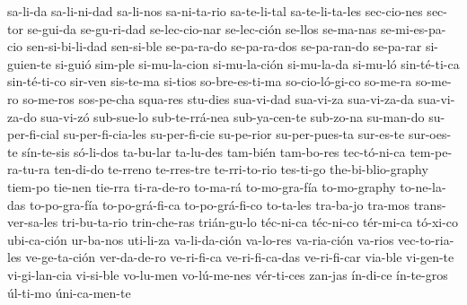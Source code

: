 {sa-li-da
sa-li-ni-dad
sa-li-nos
sa-ni-ta-rio
sa-te-li-tal
sa-te-li-ta-les
sec-cio-nes
sec-tor
se-gui-da
se-gu-ri-dad
se-lec-cio-nar
se-lec-ción
se-llos
se-ma-nas
se-mi-es-pa-cio
sen-si-bi-li-dad
sen-si-ble
se-pa-ra-do
se-pa-ra-dos
se-pa-ran-do
se-pa-rar
si-guien-te
si-guió
sim-ple
si-mu-la-cion
si-mu-la-ción
si-mu-la-da
si-mu-ló
sin-té-ti-ca
sin-té-ti-co
sir-ven
sis-te-ma
si-tios
so-bre-es-ti-ma
so-cio-ló-gi-co
so-me-ra
so-me-ro
so-me-ros
sos-pe-cha
squa-res
stu-dies
sua-vi-dad
sua-vi-za
sua-vi-za-da
sua-vi-za-do
sua-vi-zó
sub-sue-lo
sub-te-rrá-nea
sub-ya-cen-te
sub-zo-na
su-man-do
su-per-fi-cial
su-per-fi-cia-les
su-per-fi-cie
su-pe-rior
su-per-pues-ta
sur-es-te
sur-oes-te
sín-te-sis
só-li-dos
ta-bu-lar
ta-lu-des
tam-bién
tam-bo-res
tec-tó-ni-ca
tem-pe-ra-tu-ra
ten-di-do
te-rreno
te-rres-tre
te-rri-to-rio
tes-ti-go
the-bi-blio-graphy
tiem-po
tie-nen
tie-rra
ti-ra-de-ro
to-ma-rá
to-mo-gra-fía
to-mo-graphy
to-ne-la-das
to-po-gra-fía
to-po-grá-fi-ca
to-po-grá-fi-co
to-ta-les
tra-ba-jo
tra-mos
trans-ver-sa-les
tri-bu-ta-rio
trin-che-ras
trián-gu-lo
téc-ni-ca
téc-ni-co
tér-mi-ca
tó-xi-co
ubi-ca-ción
ur-ba-nos
uti-li-za
va-li-da-ción
va-lo-res
va-ria-ción
va-rios
vec-to-ria-les
ve-ge-ta-ción
ver-da-de-ro
ve-ri-fi-ca
ve-ri-fi-ca-das
ve-ri-fi-car
via-ble
vi-gen-te
vi-gi-lan-cia
vi-si-ble
vo-lu-men
vo-lú-me-nes
vér-ti-ces
zan-jas
ín-di-ce
ín-te-gros
úl-ti-mo
úni-ca-men-te
}
